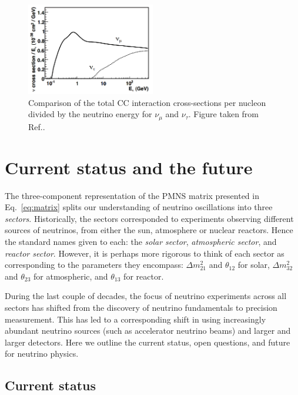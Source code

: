 \begin{figure} %
    \includegraphics[origin=c,width=0.5\textwidth]{diagrams/3-theory/tau_comparison.png}
    \caption[tau comparison short]
    {Comparison of the total CC interaction cross-sections per nucleon divided by the neutrino
        energy for $\nu_{\mu}$ and $\nu_{\tau}$. Figure taken from Ref.\cite{formaggio2012}.}
    \label{fig:tau_comparison}
\end{figure}

\section{Current status and the future} %
\label{sec:theory_status} %

The three-component representation of the PMNS matrix presented in Eq.~\ref{eq:matrix} splits our
understanding of neutrino oscillations into three \emph{sectors}. Historically, the sectors
corresponded to experiments observing different sources of neutrinos, from either the sun,
atmosphere or nuclear reactors. Hence the standard names given to each: the \emph{solar sector},
\emph{atmospheric sector}, and \emph{reactor sector}. However, it is perhaps more rigorous to
think of each sector as corresponding to the parameters they encompass: $\Delta m^{2}_{21}$ and
$\theta_{12}$ for solar, $\Delta m^{2}_{32}$ and $\theta_{23}$ for atmospheric, and $\theta_{13}$
for reactor.

During the last couple of decades, the focus of neutrino experiments across all sectors has
shifted from the discovery of neutrino fundamentals to precision measurement. This has led to a
corresponding shift in using increasingly abundant neutrino sources (such as accelerator neutrino
beams) and larger and larger detectors. Here we outline the current status, open questions, and
future for neutrino physics.

\subsection{Current status} %
\label{sec:theory_status_current} %

